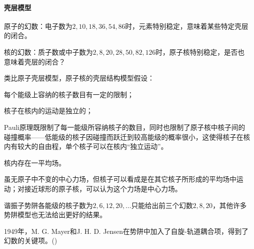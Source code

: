 \paragraph{壳层模型}原子的幻数：电子数为$2,10,18,36,54,86$时，元素特别稳定，意味着某些特定壳层的闭合。

核的幻数：质子数或中子数为$2,8,20,28,50,82,126$时，原子核特别稳定，是否也意味着壳层的闭合？

类比原子壳层模型，原子核的壳层结构模型假设：
\begin{compactenum}
	\item 每个能级上容纳的核子数目有一定的限制；
	\item 核子在核内的运动是独立的；

	Pauli原理既限制了每一能级所容纳核子的数目，同时也限制了原子核中核子间的碰撞概率——低能级的核子因碰撞而跃迁到较高能级的概率很小，这使得核子在核内有较大的自由程，单个核子可以在核内“独立运动”。
	\item 核内存在一平均场。

	虽无原子中不变的中心力场，但核子可以看成是在其它核子所形成的平均场中运动；对接近球形的原子核，可以认为这个力场是中心力场。
\end{compactenum}
谐振子势阱各能级的核子数为$2,6,12,20,\ldots$只能给出前三个幻数$2,8,20$，其他许多势阱模型也无法给出更好的结果。

1949年，M. G. Mayer和J. H. D. Jensen在势阱中加入了自旋-轨道耦合项，得到了幻数的关键项。()

